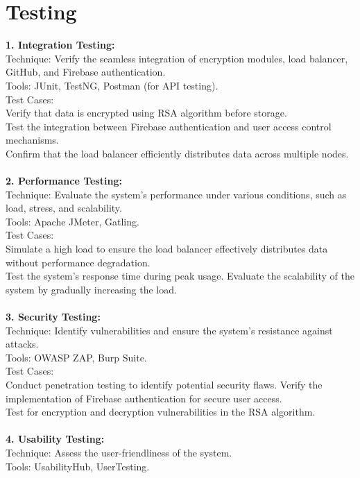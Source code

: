 \chapter{Testing}
\textbf{1. Integration Testing:}\\
Technique: Verify the seamless integration of encryption modules, load balancer, GitHub, and
Firebase authentication.\\
Tools: JUnit, TestNG, Postman (for API testing).\\
Test Cases:\\
Verify that data is encrypted using RSA algorithm before storage.\\
Test the integration between Firebase authentication and user access control mechanisms.\\
Confirm that the load balancer efficiently distributes data across multiple nodes.
\\
\\
\textbf{2. Performance Testing:}\\
Technique: Evaluate the system's performance under various conditions, such as load, stress, and
scalability.\\
Tools: Apache JMeter, Gatling.\\
Test Cases:\\
Simulate a high load to ensure the load balancer effectively distributes data without performance
degradation.\\
Test the system's response time during peak usage.
Evaluate the scalability of the system by gradually increasing the load. 
\\
\\
\textbf{3. Security Testing:}\\
Technique: Identify vulnerabilities and ensure the system's resistance against attacks.\\
Tools: OWASP ZAP, Burp Suite.\\
Test Cases:\\
Conduct penetration testing to identify potential security flaws.
Verify the implementation of Firebase authentication for secure user access.\\
Test for encryption and decryption vulnerabilities in the RSA algorithm. 
\\
\\
\textbf{4. Usability Testing:}\\
Technique: Assess the user-friendliness of the system.\\
Tools: UsabilityHub, UserTesting.\\
